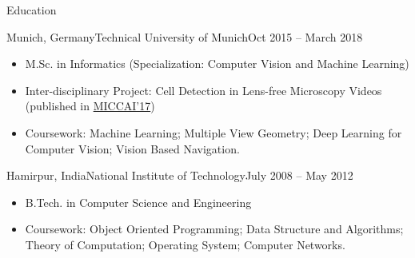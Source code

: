 \documentclass[]{mcdowellcv}
\begin{document}
	
	\makeheader
	
	\begin{cvsection}{Education}
		\begin{cvsubsection}{Munich, Germany}{Technical University of Munich}{Oct 2015 -- March 2018}
			\begin{itemize}
				\item M.Sc. in Informatics (Specialization: Computer Vision and Machine Learning)
				\item Inter-disciplinary Project: Cell Detection in Lens-free Microscopy Videos (published in \href{https://link.springer.com/chapter/10.1007/978-3-319-66185-8_1}{MICCAI'17})
				\item Coursework: Machine Learning; Multiple View Geometry; Deep Learning for Computer Vision; Vision Based Navigation.
			\end{itemize}
		\end{cvsubsection}
		\begin{cvsubsection}{Hamirpur, India}{National Institute of Technology}{July 2008 -- May 2012}
			\begin{itemize}
				\item B.Tech. in Computer Science and Engineering
				\item Coursework: Object Oriented Programming; Data Structure and Algorithms; Theory of Computation; Operating System; Computer Networks.
			\end{itemize}
		\end{cvsubsection}
	\end{cvsection}
	
\end{document}
